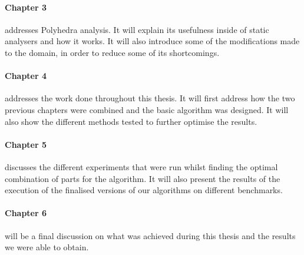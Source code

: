 \paragraph{Chapter 3}addresses Polyhedra analysis. It will explain its usefulness inside of static analysers and how it works. It will also introduce some of the modifications made to the domain, in order to reduce some of its shortcomings.

\paragraph{Chapter 4}addresses the work done throughout this thesis. It will first address how the two previous chapters were combined and the basic algorithm was designed. It will also show the different methods tested to further optimise the results.

\paragraph{Chapter 5}discusses the different experiments that were run whilst finding the optimal combination of parts for the algorithm. It will also present the results of the execution of the finalised versions of our algorithms on different benchmarks.

\paragraph{Chapter 6}will be a final discussion on what was achieved during this thesis and the results we were able to obtain.









